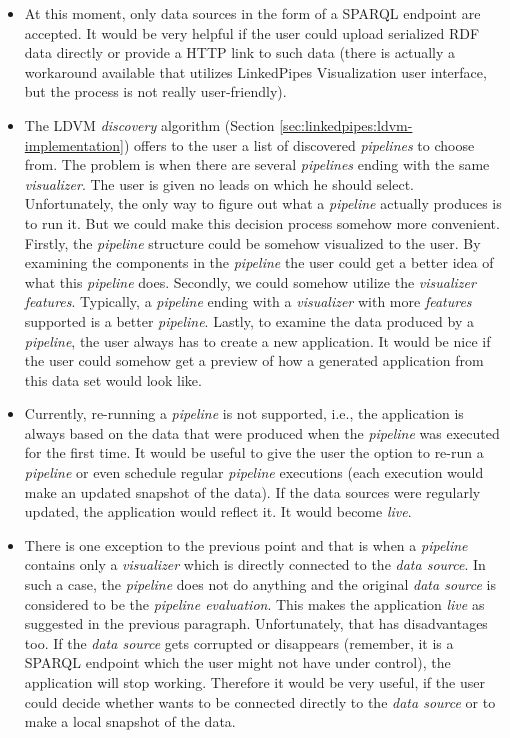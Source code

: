 \begin{itemize}
\item At this moment, only data sources in the form of a SPARQL endpoint are accepted. It would be very helpful if the user could upload serialized RDF data directly or provide a HTTP link to such data (there is actually a workaround available that utilizes LinkedPipes Visualization user interface, but the process is not really user-friendly).
\item The LDVM \emph{discovery} algorithm (Section \ref{sec:linkedpipes:ldvm-implementation}) offers to the user a list of discovered \emph{pipelines} to choose from. The problem is when there are several \emph{pipelines} ending with the same \emph{visualizer}. The user is given no leads on which he should select. Unfortunately, the only way to figure out what a \emph{pipeline} actually produces is to run it. But we could make this decision process somehow more convenient. Firstly, the \emph{pipeline} structure could be somehow visualized to the user. By examining the components in the \emph{pipeline} the user could get a better idea of what this \emph{pipeline} does. Secondly, we could somehow utilize the \emph{visualizer features}. Typically, a \emph{pipeline} ending with a \emph{visualizer} with more \emph{features} supported is a better \emph{pipeline}. Lastly, to examine the data produced by a \emph{pipeline}, the user always has to create a new application. It would be nice if the user could somehow get a preview of how a generated application from this data set would look like.
\item Currently, re-running a \emph{pipeline} is not supported, i.e., the application is always based on the data that were produced when the \emph{pipeline} was executed for the first time. It would be useful to give the user the option to re-run a \emph{pipeline} or even schedule regular \emph{pipeline} executions (each execution would make an updated snapshot of the data). If the data sources were regularly updated, the application would reflect it. It would become \emph{live}.
\item There is one exception to the previous point and that is when a \emph{pipeline} contains only a \emph{visualizer} which is directly connected to the \emph{data source}. In such a case, the \emph{pipeline} does not do anything and the original \emph{data source} is considered to be the \emph{pipeline evaluation}. This makes the application \emph{live} as suggested in the previous paragraph. Unfortunately, that has disadvantages too. If the \emph{data source} gets corrupted or disappears (remember, it is a SPARQL endpoint which the user might not have under control), the application will stop working. Therefore it would be very useful, if the user could decide whether wants to be connected directly to the \emph{data source} or to make a local snapshot of the data.
\end{itemize}

